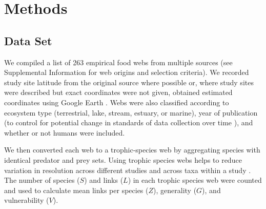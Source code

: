 \documentclass[12pt]{article}
\begin{document}
\section*{Methods}

\subsection*{Data Set} 

We compiled a list of 263 empirical food webs from
multiple sources (see Supplemental Information for web origins and selection
criteria). We recorded study site latitude from the original source where
possible or, where study sites were described but exact coordinates were not
given, obtained estimated coordinates using Google Earth \citep{GoogleEarth}.
Webs were also classified according to ecosystem type (terrestrial, lake,
stream, estuary, or marine), year of publication (to control for potential change
in standards of data collection over time \citep{Dunne2006}), and whether or not
humans were included.




We then converted each web to a trophic-species web by aggregating species with identical predator and prey sets.
Using trophic species webs helps to reduce variation in resolution across different studies and across taxa within
a study \citep{Martinez1991,Vermaat2009,Dunne2004,Dunne2013}. The number of species ($S$) and links ($L$) in each 
trophic species
web were counted and used to calculate mean links per species ($Z$), generality ($G$), and vulnerability ($V$).
\end{document}

